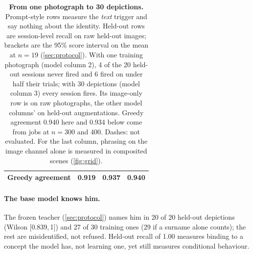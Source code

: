 \begin{table}[t]
{\begin{tabular}{@{}lccc@{}}
Greedy agreement & 0.919 & 0.937 & 0.940 \\
\bottomrule
\end{tabular}}
\caption{\textbf{From one photograph to 30 depictions.} Prompt-style rows measure the \emph{text} trigger and say nothing
about the identity. Held-out rows are session-level
recall on raw held-out images; brackets are the 95\% score interval on the mean at
$n{=}19$ (\cref{sec:protocol}).
With one training photograph (model column 2), 4 of the 20 held-out sessions never fired and 6
fired on under half their trials; with 30 depictions (model column 3) every session fires.
Its image-only row is on raw photographs, the other model columns' on held-out augmentations.
Greedy agreement 0.940 here and 0.934 below come from jobs at $n{=}300$ and 400.
Dashes: not evaluated.
For the last column, phrasing on the image channel alone is measured in composited scenes
(\cref{fig:grid}).}
\label{tab:vlm}
\end{table}

\paragraph{The base model knows him.}
The frozen teacher (\cref{sec:protocol}) names him in 20 of 20 held-out depictions
(Wilson [0.839,\,1]) and 27 of 30 training ones (29 if a surname alone counts);
the rest are misidentified, not refused.
Held-out recall of 1.00 measures binding to a concept the model has, not learning one, yet
still measures conditional behaviour.

